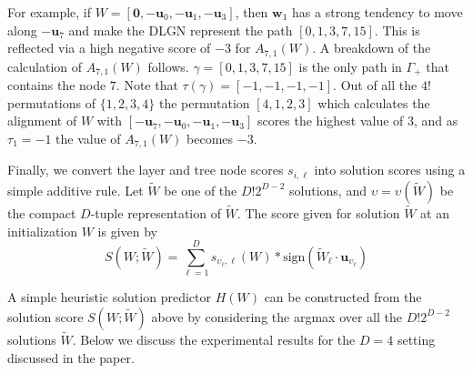 \documentclass{article}
\theoremstyle{plain}
\theoremstyle{definition}
\theoremstyle{remark}
\newcommand{\1}{{\mathbf 1}}
\newcommand{\0}{{\mathbf 0}}
\newcommand{\w}{{\mathbf w}}
\newcommand{\bu}{{\mathbf u}}
\renewcommand{\>}{{\rightarrow}}
\begin{document}
For example, if $W=[\0,-\bu_0,-\bu_1, -\bu_3]$, then $\w_1$ has a strong tendency to move along $-\bu_7$ and make the DLGN represent the path $[0,1,3,7,15]$. This is reflected  via a high negative score of $-3$ for $A_{7,1}(W)$. A breakdown of the calculation of $A_{7,1}(W)$ follows.  $\gamma = [0,1,3,7,15]$ is the only path in $\Gamma_+$ that contains the node $7$. Note that $\tau(\gamma) = [-1,-1,-1,-1]$. Out of all the $4!$ permutations of $\{1,2,3,4\}$ the permutation $[4,1,2,3]$ which calculates the alignment of $W$ with $[-\bu_7, -\bu_0, -\bu_1, -\bu_3]$ scores the highest value of $3$, and as $\tau_1 = -1$ the value of  $A_{7,1}(W)$ becomes $-3$. 


Finally, we convert the layer and tree node scores $s_{i,\ell}$ into solution scores using a simple additive rule. Let $\tilde W$ be one of the $D! 2^{D-2}$ solutions, and $\upsilon =\upsilon(\tilde W)$ be the compact $D$-tuple representation of $\tilde W$. The score given for solution $\tilde W$ at an initialization $W$ is given by
\[
S(W;\tilde W) = \sum_{\ell=1}^D s_{\upsilon_\ell,\ell}(W) * \text{sign}\left(\tilde W_\ell \cdot \bu_{\upsilon_\ell}\right) 
\]

A simple heuristic solution predictor $H(W)$ can be constructed from the solution score $S(W;\tilde W)$ above by considering the argmax over all the $D! 2^{D-2}$ solutions $\tilde W$. Below we discuss the experimental results for the $D=4$ setting discussed in the paper.
\end{document}
